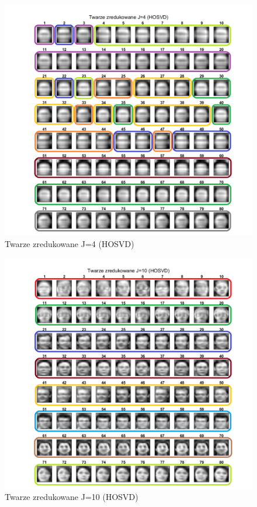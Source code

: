 \documentclass[11pt, a4paper]{article}
\begin{document}
\begin{figure}[H]
	\centering
	\includegraphics[width=1\textwidth]{./assets/rezultat_HOSVD_j4.png}
	\caption{Twarze zredukowane J=4 (HOSVD)}
	\label{fig:rezultat_HOSVD_j4}
\end{figure}

\begin{figure}[H]
	\centering
	\includegraphics[width=1\textwidth]{./assets/rezultat_HOSVD_j10.png}
	\caption{Twarze zredukowane J=10 (HOSVD)}
	\label{fig:rezultat_HOSVD_j10}
\end{figure}
\end{document}
